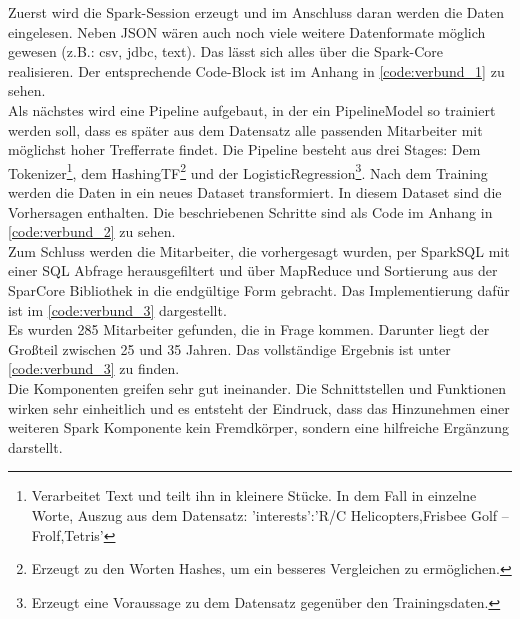 \noindent
Zuerst wird die Spark-Session erzeugt und im Anschluss daran werden die Daten eingelesen. Neben JSON wären auch noch viele weitere Datenformate möglich gewesen (z.B.: csv, jdbc, text). Das lässt sich alles über die Spark-Core realisieren. Der entsprechende Code-Block ist im Anhang in \autoref{code:verbund_1} zu sehen.\\

\noindent
Als nächstes wird eine Pipeline aufgebaut, in der ein PipelineModel so trainiert werden soll, dass es später aus dem Datensatz alle passenden Mitarbeiter mit möglichst hoher Trefferrate findet. Die Pipeline besteht aus drei Stages: Dem Tokenizer\footnote{Verarbeitet Text und teilt ihn in kleinere Stücke. In dem Fall in einzelne Worte, Auszug aus dem Datensatz: 'interests':'R/C Helicopters,Frisbee Golf – Frolf,Tetris'}, dem HashingTF\footnote{Erzeugt zu den Worten Hashes, um ein besseres Vergleichen zu ermöglichen.} und der LogisticRegression\footnote{Erzeugt eine Voraussage zu dem Datensatz gegenüber den Trainingsdaten.}. Nach dem Training werden die Daten in ein neues Dataset transformiert. In diesem Dataset sind die Vorhersagen enthalten. Die beschriebenen Schritte sind als Code im Anhang in \autoref{code:verbund_2} zu sehen. \\

\noindent
Zum Schluss werden die Mitarbeiter, die vorhergesagt wurden, per SparkSQL mit einer SQL Abfrage herausgefiltert und über MapReduce und Sortierung aus der SparCore Bibliothek in die endgültige Form gebracht. Das Implementierung dafür ist im \autoref{code:verbund_3} dargestellt. \\

\noindent
Es wurden 285 Mitarbeiter gefunden, die in Frage kommen. Darunter liegt der Großteil zwischen 25 und 35 Jahren. Das vollständige Ergebnis ist unter \autoref{code:verbund_3} zu finden.\\

\noindent
Die Komponenten greifen sehr gut ineinander. Die Schnittstellen und Funktionen wirken sehr einheitlich und es entsteht der Eindruck, dass das Hinzunehmen einer weiteren Spark Komponente kein Fremdkörper, sondern eine hilfreiche Ergänzung darstellt.

 








